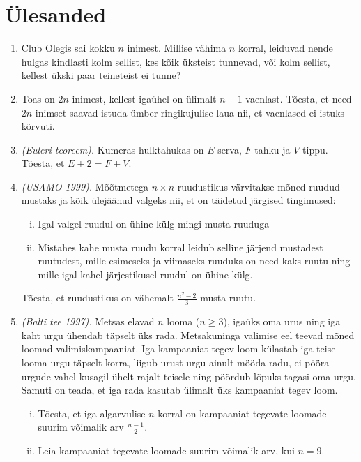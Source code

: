 \documentclass{article}
\begin{document}
	\section{Ülesanded}
	\begin{enumerate}
		\item
		Club Olegis sai kokku $n$ inimest. Millise vähima $n$ korral, leiduvad nende hulgas kindlasti kolm sellist, kes kõik üksteist tunnevad, või kolm sellist, kellest ükski paar teineteist ei tunne?
		
		\item
		Toas on $2n$ inimest, kellest igaühel on ülimalt  $n-1$ vaenlast. Tõesta, et need $2n$ inimset saavad istuda ümber ringikujulise laua nii, et vaenlased ei istuks kõrvuti.
		\item
		\emph{(Euleri teoreem).} Kumeras hulktahukas on $E$ serva, $F$ tahku ja $V$ tippu. Tõesta, et $E+2=F+V$.
		
		\item
		\emph{(USAMO 1999).}
		Mõõtmetega $n \times n$ ruudustikus värvitakse mõned ruudud mustaks ja kõik ülejäänud valgeks nii, et on täidetud järgised tingimused:
		\begin{enumerate}[(i)]
			\item
			Igal valgel ruudul on ühine külg mingi musta ruuduga
			\item
			Mistahes kahe musta ruudu korral leidub selline järjend mustadest ruutudest,  mille esimeseks ja viimaseks ruuduks on need kaks ruutu ning mille igal kahel järjestikusel ruudul on ühine külg.
		\end{enumerate}
		Tõesta, et ruudustikus on vähemalt $\frac{n^2-2}{3}$ musta ruutu.
		
		\item
		\emph{(Balti tee 1997).} Metsas elavad $n$ looma ($n \geq 3$), igaüks oma urus ning iga kaht urgu ühendab täpselt üks rada. Metsakuninga valimise eel teevad mõned loomad valimiskampaaniat. Iga kampaaniat tegev loom külastab iga teise looma urgu täpselt korra, liigub urust urgu ainult mööda radu, ei pööra urgude vahel kusagil ühelt rajalt teisele ning pöördub lõpuks tagasi oma urgu. Samuti on teada, et iga rada kasutab ülimalt üks kampaaniat tegev loom.
		\begin{enumerate}[(i)]
			\item
			Tõesta, et iga algarvulise $n$ korral on kampaaniat tegevate loomade suurim võimalik arv $\frac{n-1}{2}$.
			\item
			Leia kampaaniat tegevate loomade suurim võimalik arv, kui $n=9$.			
		\end{enumerate}
		

\end{enumerate}
\end{document}
